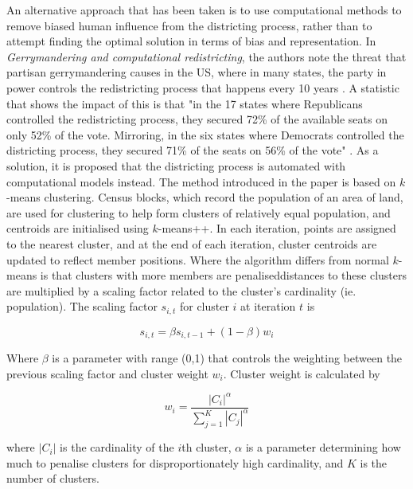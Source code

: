 \documentclass{article}
\begin{document}
An alternative approach that has been taken is to use computational methods to remove biased human influence from the districting process, rather than to attempt finding the optimal solution in terms of bias and representation.
In \textit{Gerrymandering and computational redistricting}, the authors note the threat that partisan gerrymandering causes in the US, where in many states, the party in power controls the 
redistricting process that happens every 10 years \cite{gerrymander}. A statistic that shows the impact of this is that "in the 17 states where Republicans controlled the redistricting process, 
they secured 72\% of the available seats on only 52\% of the vote. Mirroring, in the six states where Democrats controlled the districting process, they secured 71\% of the seats on 56\% of 
the vote" \cite{gerrymandering}. As a solution, it is proposed that the districting process is automated with computational models instead. The method introduced in the paper is based on 
$k$-means clustering. Census blocks, which record the population of an area of land, are used for clustering to help form clusters of relatively equal population, and
centroids are initialised using $k$-means++. In each iteration, points are assigned to the nearest cluster, and at the end of each iteration, cluster centroids are updated to reflect member positions.
Where the algorithm differs from normal $k$-means is that clusters with more members are penalised\textemdash distances to these clusters are multiplied by a scaling factor related to
the cluster's cardinality (ie. population). The scaling factor $s_{i,t}$ for cluster $i$ at iteration $t$ is 

\begin{equation}
    s_{i,t} = \beta s_{i,t-1} + (1-\beta)w_i
    \label{eq:scalefactor}
\end{equation}

Where $\beta$ is a parameter with range (0,1) that controls the weighting between the previous scaling factor and cluster weight $w_i$.
Cluster weight is calculated by

\begin{equation}
    w_i = \frac{|C_i|^\alpha}{\sum_{j=1}^{K} |C_j|^\alpha}
    \label{eq:clusterweight}
\end{equation}

where \(|C_i|\) is the cardinality of the $i$th cluster, $\alpha$ is a parameter determining how much to penalise clusters for disproportionately high cardinality, and $K$ is the number of clusters.
\end{document}

